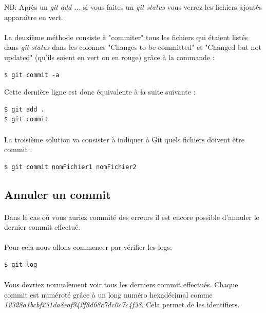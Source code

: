 \documentclass[french, a4paper, 12pt, titlepage]{article}
\begin{document}
NB: Après un \emph{git add ...} si vous faites un \emph{git status} vous verrez les fichiers ajoutés apparaître en vert.

\paragraph{}La deuxième méthode consiste à "commiter" tous les fichiers qui étaient listés dans \emph{git status} dans les colonnes "Changes to be committed" et "Changed but not updated" (qu’ils soient en vert ou en rouge) grâce à la commande :
\begin{lstlisting}
$ git commit -a
\end{lstlisting}
Cette dernière ligne est donc équivalente à la suite suivante :
\begin{lstlisting}
$ git add .
$ git commit
\end{lstlisting}

\paragraph{}La troisième solution va consister à indiquer à Git quels fichiers doivent être commit :
\begin{lstlisting}
$ git commit nomFichier1 nomFichier2
\end{lstlisting}

\subsection{Annuler un commit}
\paragraph{}Dans le cas où vous auriez commité des erreurs il est encore possible d'annuler le dernier commit effectué.
\paragraph{}Pour cela nous allons commencer par vérifier les logs:
\begin{lstlisting}
$ git log
\end{lstlisting}

\paragraph{}Vous devriez normalement voir tous les derniers commit effectués. Chaque commit est numéroté grâce à un long numéro hexadécimal comme \textit{12328a1bcbf231da8eaf942f8d68c7dc0c7c4f38}.
Cela permet de les identifiers.
\end{document}
